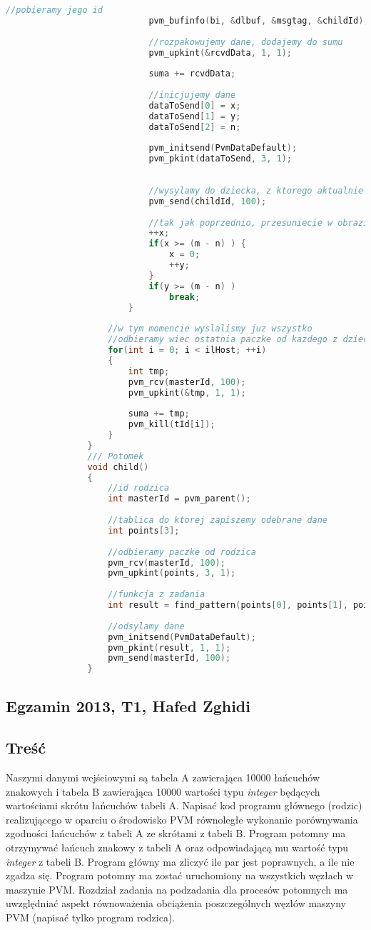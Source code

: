 \begin{lstlisting}[language=C]
							//pobieramy jego id
							pvm_bufinfo(bi, &dlbuf, &msgtag, &childId);
							
							//rozpakowujemy dane, dodajemy do sumu
							pvm_upkint(&rcvdData, 1, 1);
							
							suma += rcvdData;
							
							//inicjujemy dane
							dataToSend[0] = x;
							dataToSend[1] = y;
							dataToSend[2] = n;
							
							pvm_initsend(PvmDataDefault);
							pvm_pkint(dataToSend, 3, 1);
							
							
							//wysylamy do dziecka, z ktorego aktualnie odebrano rezultat
							pvm_send(childId, 100);
							
							//tak jak poprzednio, przesuniecie w obrazie
							++x;
							if(x >= (m - n) ) {
								x = 0;
								++y;
							}
							if(y >= (m - n) )
								break;
						}
					
					//w tym momencie wyslalismy juz wszystko
					//odbieramy wiec ostatnia paczke od kazdego z dzieci
					for(int i = 0; i < ilHost; ++i)
					{
						int tmp;
						pvm_rcv(masterId, 100);
						pvm_upkint(&tmp, 1, 1);
						
						suma += tmp;
						pvm_kill(tId[i]);
					}         
				}
				/// Potomek
				void child()
				{
					//id rodzica
					int masterId = pvm_parent();
					
					//tablica do ktorej zapiszemy odebrane dane
					int points[3];
					
					//odbieramy paczke od rodzica
					pvm_rcv(masterId, 100);
					pvm_upkint(points, 3, 1);
					
					//funkcja z zadania
					int result = find_pattern(points[0], points[1], points[2]);
					
					//odsylamy dane
					pvm_initsend(PvmDataDefault);
					pvm_pkint(result, 1, 1);
					pvm_send(masterId, 100);
				}
			\end{lstlisting}
	
	\newpage
	\subsection{Egzamin 2013, T1, Hafed Zghidi}
		\subsection{Treść}
			Naszymi danymi wejściowymi są tabela A zawierająca 10000 łańcuchów znakowych i tabela B zawierająca 10000 wartości typu \textit{integer} będących wartościami skrótu łańcuchów tabeli A. Napisać kod programu głównego (rodzic) realizującego w oparciu o środowisko PVM równoległe wykonanie porównywania zgodności łańcuchów z tabeli A ze skrótami z tabeli B. Program potomny ma otrzymywać łańcuch znakowy z tabeli A oraz odpowiadającą mu wartość typu \textit{integer} z tabeli B. Program główny ma zliczyć ile par jest poprawnych, a ile nie zgadza się. Program potomny ma zostać uruchomiony na wszystkich węzłach w maszynie PVM. Rozdział zadania na podzadania dla procesów potomnych ma uwzględniać aspekt równoważenia obciążenia poszczególnych węzłów maszyny PVM (napisać tylko program rodzica).
